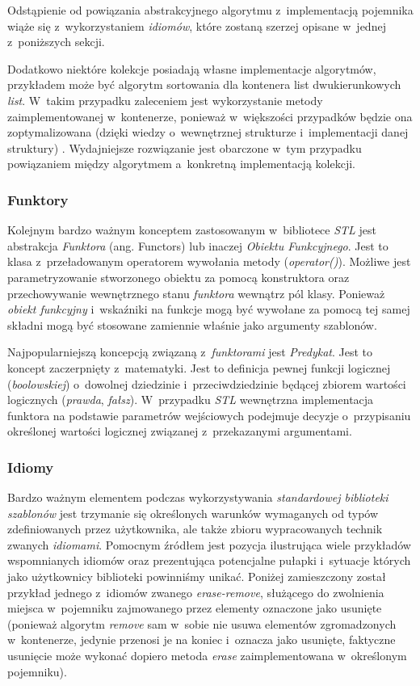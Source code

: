       Odstąpienie od powiązania abstrakcyjnego algorytmu z~implementacją pojemnika wiąże się z~wykorzystaniem \textit{idiomów}, które zostaną szerzej opisane w~jednej z~poniższych sekcji.

      Dodatkowo niektóre kolekcje posiadają własne implementacje algorytmów, przykładem może być algorytm sortowania dla kontenera list dwukierunkowych \textit{list}. W~takim przypadku zaleceniem jest wykorzystanie metody zaimplementowanej w~kontenerze, ponieważ w~większości przypadków będzie ona zoptymalizowana (dzięki wiedzy o~wewnętrznej strukturze i~implementacji danej struktury) \cite{EffectiveStl}. Wydajniejsze rozwiązanie jest obarczone w~tym przypadku powiązaniem między algorytmem a~konkretną implementacją kolekcji.

      \subsubsection{Funktory}
      Kolejnym bardzo ważnym konceptem zastosowanym w~bibliotece \textit{STL} jest abstrakcja \textit{Funktora} (ang. Functors) lub inaczej \textit{Obiektu Funkcyjnego}. Jest to klasa z~przeładowanym operatorem wywołania metody (\textit{operator()}). Możliwe jest parametryzowanie stworzonego obiektu za pomocą konstruktora oraz przechowywanie wewnętrznego stanu \textit{funktora} wewnątrz pól klasy. Ponieważ \textit{obiekt funkcyjny} i~wskaźniki na funkcje mogą być wywołane za pomocą tej samej składni mogą być stosowane zamiennie właśnie jako argumenty szablonów.

      Najpopularniejszą koncepcją związaną z~\textit{funktorami} jest \textit{Predykat}. Jest to koncept zaczerpnięty z~matematyki. Jest to definicja pewnej funkcji logicznej (\textit{boolowskiej}) o~dowolnej dziedzinie i~przeciwdziedzinie będącej zbiorem wartości logicznych (\textit{prawda}, \textit{fałsz}). W~przypadku \textit{STL} wewnętrzna implementacja funktora na podstawie parametrów wejściowych podejmuje decyzje o~przypisaniu określonej wartości logicznej związanej z~przekazanymi argumentami.

      \subsubsection{Idiomy}\label{Idioms}
      Bardzo ważnym elementem podczas wykorzystywania \textit{standardowej biblioteki szablonów} jest trzymanie się określonych warunków wymaganych od typów zdefiniowanych przez użytkownika, ale także zbioru wypracowanych technik zwanych \textit{idiomami}. Pomocnym źródłem jest pozycja \cite{EffectiveStl} ilustrująca wiele przykładów wspomnianych idiomów oraz prezentująca potencjalne pułapki i~sytuacje których jako użytkownicy biblioteki powinniśmy unikać. Poniżej zamieszczony został przykład jednego z~idiomów zwanego \textit{erase-remove}, służącego do zwolnienia miejsca w~pojemniku zajmowanego przez elementy oznaczone jako usunięte (ponieważ algorytm \textit{remove} sam w~sobie nie usuwa elementów zgromadzonych w~kontenerze, jedynie przenosi je na koniec i~oznacza jako usunięte, faktyczne usunięcie może wykonać dopiero metoda \textit{erase} zaimplementowana w~określonym pojemniku).

